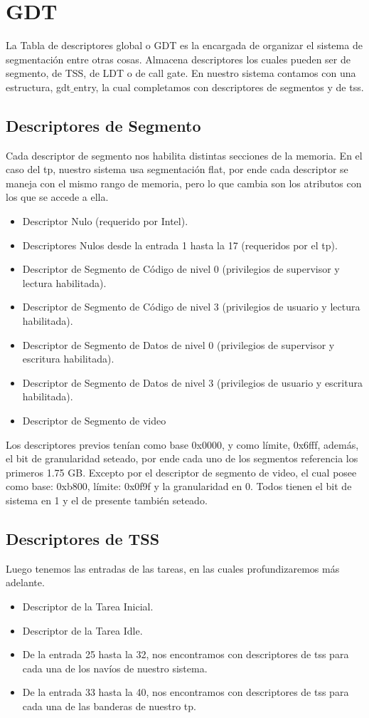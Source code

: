 
\section{GDT}
\par{La Tabla de descriptores global o GDT es la encargada de organizar el sistema de segmentación entre otras cosas. Almacena descriptores los cuales pueden ser de segmento, de TSS, de LDT o de call gate. En nuestro sistema contamos con una estructura, gdt$\_$entry, la cual completamos con descriptores de segmentos y de tss.}
\subsection{Descriptores de Segmento}
\par{
Cada descriptor de segmento nos habilita distintas secciones de la memoria. En el caso del tp, nuestro sistema usa segmentación flat, por ende cada descriptor se maneja con el mismo rango de memoria, pero lo que cambia son los atributos con los que se accede a ella.
\begin{itemize}
\item Descriptor Nulo (requerido por Intel).
\item Descriptores Nulos desde la entrada 1 hasta la 17 (requeridos por el tp).
\item Descriptor de Segmento de Código de nivel 0 (privilegios de supervisor y lectura habilitada).
\item Descriptor de Segmento de Código de nivel 3 (privilegios de usuario y lectura habilitada).
\item Descriptor de Segmento de Datos de nivel 0 (privilegios de supervisor y escritura habilitada).
\item Descriptor de Segmento de Datos de nivel 3 (privilegios de usuario y escritura habilitada).
\item Descriptor de Segmento de video 
\end{itemize}
\medskip
\par{Los descriptores previos tenían como base 0x0000, y como límite, 0x6fff, además, el bit de granularidad seteado, por ende cada uno de los segmentos referencia los primeros 1.75 GB. Excepto por el descriptor de segmento de video, el cual posee como base: 0xb800, límite: 0x0f9f y la granularidad en 0.
Todos tienen el bit de sistema en 1 y el de presente también seteado.
}
\medskip

\subsection{Descriptores de TSS}
Luego tenemos las entradas de las tareas, en las cuales profundizaremos más adelante.
\begin{itemize}
\item Descriptor de la Tarea Inicial.
\item Descriptor de la Tarea Idle.
\item De la entrada 25 hasta la 32, nos encontramos con descriptores de tss para cada una de los navíos de nuestro sistema.
\item De la entrada 33 hasta la 40, nos encontramos con descriptores de tss para cada una de las banderas de nuestro tp.
\end{itemize}


}
